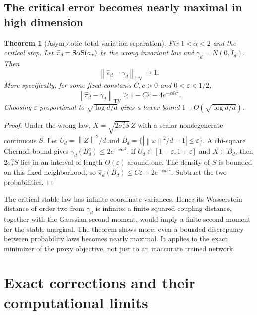 \documentclass[pdflatex,iicol,sn-mathphys-ay]{sn-jnl}
\newtheorem{theorem}{Theorem}[section]
\theoremstyle{definition}\newtheorem{definition}[theorem]{Definition}
\theoremstyle{remark}\newtheorem{remark}[theorem]{Remark}
\numberwithin{equation}{section}
\newcommand{\norm}[1]{\left\lVert#1\right\rVert}\newcommand{\TV}{\mathrm{TV}}
\newcommand{\1}{\mathbf 1}
\begin{document}
\subsection{The critical error becomes nearly maximal in high dimension}
\begin{theorem}[Asymptotic total-variation separation]\label{thm:TVdimension}
Fix $1<\alpha<2$ and the critical step. Let $\widehat\pi_d=\mathrm{S}\alpha\mathrm{S}(\sigma_*)$ be the wrong invariant law and $\gamma_d=N(0,I_d)$. Then
\begin{equation}
\norm{\widehat\pi_d-\gamma_d}_{\TV}\longrightarrow1.
\end{equation}
More specifically, for some fixed constants $C,c>0$ and $0<\varepsilon<1/2$,
\begin{equation}
\norm{\widehat\pi_d-\gamma_d}_{\TV}
\ge1-C\varepsilon-4e^{-cd\varepsilon^2}.\label{eq:TVrate}
\end{equation}
Choosing $\varepsilon$ proportional to $\sqrt{\log d/d}$ gives a lower bound $1-O(\sqrt{\log d/d})$.
\end{theorem}
\begin{proof}
Under the wrong law, $X=\sqrt{2\sigma_*^2S}\,Z$ with a scalar nondegenerate continuous $S$. Let $U_d=\norm Z^2/d$ and $B_d=\{|\norm x^2/d-1|\le\varepsilon\}$. A chi-square Chernoff bound gives $\gamma_d(B_d^c)\le2e^{-cd\varepsilon^2}$. If $U_d\in[1-\varepsilon,1+\varepsilon]$ and $X\in B_d$, then $2\sigma_*^2S$ lies in an interval of length $O(\varepsilon)$ around one. The density of $S$ is bounded on this fixed neighborhood, so $\widehat\pi_d(B_d)\le C\varepsilon+2e^{-cd\varepsilon^2}$. Subtract the two probabilities.
\end{proof}
The critical stable law has infinite coordinate variances. Hence its Wasserstein distance of order two from $\gamma_d$ is infinite: a finite squared coupling distance, together with the Gaussian second moment, would imply a finite second moment for the stable marginal. The theorem shows more: even a bounded discrepancy between probability laws becomes nearly maximal. It applies to the exact minimizer of the proxy objective, not just to an inaccurate trained network.


\section{Exact corrections and their computational limits}\label{sec:exact}
\end{document}
